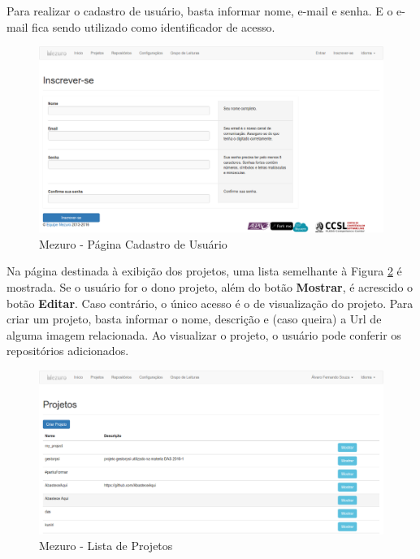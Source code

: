 \newpage

Para realizar o cadastro de usuário, basta informar nome, e-mail e senha. E o
e-mail fica sendo utilizado como identificador de acesso.

\begin{figure}[!htb]
	\centering
    \includegraphics[keepaspectratio=true,scale=0.3]
    {figuras/mezuro-cadastro.eps}
  \caption{Mezuro - Página Cadastro de Usuário}
	\label{fig:mezuro-cadastro}
\end{figure}

\newpage

Na página destinada à exibição dos projetos, uma lista semelhante à Figura
\ref{fig:mezuro-projetos-v2} é mostrada. Se o usuário for o dono projeto, além do
botão \textbf{Mostrar}, é acrescido o botão \textbf{Editar}. Caso contrário, o
único acesso é o de visualização do projeto. Para criar um projeto, basta
informar o nome, descrição e (caso queira) a Url de alguma imagem relacionada.
Ao visualizar o projeto, o usuário pode conferir os repositórios adicionados.

\begin{figure}[!htb]
	\centering
    \includegraphics[keepaspectratio=true,scale=0.3]
    {figuras/mezuro-projetos-v2.eps}
  \caption{Mezuro - Lista de Projetos}
	\label{fig:mezuro-projetos-v2}
\end{figure}

